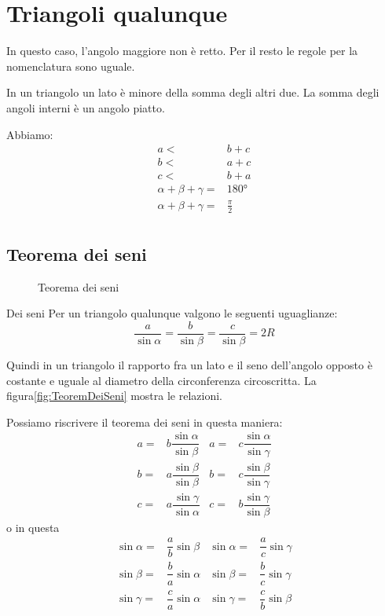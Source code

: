 \section{Triangoli qualunque}
In questo caso, l'angolo maggiore non è  retto. Per il resto le regole per la  nomenclatura sono uguale.
\begin{teoremat}{}{}
In un triangolo un lato è minore della somma degli altri due. La somma degli angoli interni è un angolo piatto.
\end{teoremat}
 Abbiamo:
 \begin{align*}
a<&b+c\\
b<&a+c\\
c<&b+a\\
\alpha+\beta+\gamma=&\ang{180}\\
\alpha+\beta+\gamma=&\frac{\pi}{2}\\
\end{align*}
\subsection{Teorema dei seni}
\begin{figure}
	\centering
	
	\caption{Teorema dei seni}
	\label{fig:TeoremDeiSeni}
\end{figure}
\begin{teoremat}{Dei seni}{}
Per un triangolo qualunque valgono le seguenti uguaglianze:\[\dfrac{a}{\sin\alpha}=\dfrac{b}{\sin\beta}=\dfrac{c}{\sin\beta}=2R \]
\end{teoremat}
Quindi in un triangolo  il rapporto fra un lato e il seno dell'angolo opposto è costante e uguale al diametro della circonferenza circoscritta. La figura\nobs\vref{fig:TeoremDeiSeni} mostra le relazioni.

Possiamo riscrivere il teorema dei seni in questa maniera: 
\begin{align*}
a=&b\dfrac{\sin\alpha}{\sin\beta}& a=&c\dfrac{\sin\alpha}{\sin\gamma}\\
b=&a\dfrac{\sin\beta}{\sin\beta}& b=&c\dfrac{\sin\beta}{\sin\gamma}\\
c=&a\dfrac{\sin\gamma}{\sin\alpha}& c=&b\dfrac{\sin\gamma}{\sin\beta}
\end{align*}
o in questa
\begin{align*}
\sin\alpha=&\dfrac{a}{b}\sin\beta&\sin\alpha=&\dfrac{a}{c}\sin\gamma\\
\sin\beta=&\dfrac{b}{a}\sin\alpha&\sin\beta=&\dfrac{b}{c}\sin\gamma\\
\sin\gamma=&\dfrac{c}{a}\sin\alpha&\sin\gamma=&\dfrac{c}{b}\sin\beta\\
\end{align*}
